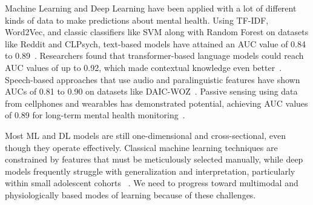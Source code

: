 \documentclass[10pt,letterpaper]{article}
\begin{document}
        Machine Learning and Deep Learning have been applied with a lot of different kinds of data to make predictions about mental health. Using TF-IDF, Word2Vec, and classic classifiers like SVM along with Random Forest on datasets like Reddit and CLPsych, text-based models have attained an AUC value of 0.84 to 0.89~\cite{ref11,ref13}. Researchers found that transformer-based language models could reach AUC values of up to 0.92, which made contextual knowledge even better~\cite{ref17}. Speech-based approaches that use audio and paralinguistic features have shown AUCs of 0.81 to 0.90 on datasets like DAIC-WOZ~\cite{ref14}. Passive sensing using data from cellphones and wearables has demonstrated potential, achieving AUC values of 0.89 for long-term mental health monitoring~\cite{ref9,ref12}.

        Most ML and DL models are still one-dimensional and cross-sectional, even though they operate effectively. Classical machine learning techniques are constrained by features that must be meticulously selected manually, while deep models frequently struggle with generalization and interpretation, particularly within small adolescent cohorts ~\cite{ref15,ref16}. We need to progress toward multimodal and physiologically based modes of learning because of these challenges.
\end{document}

